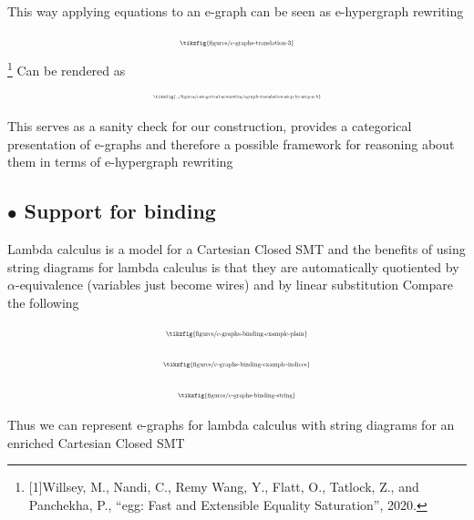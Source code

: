 \documentclass[aspectratio=169]{beamer}
\newcommand{\bsubsection}[1]{\subsection{$\bullet$ #1}}
\begin{document}
\begin{frame}{}
    \small
    This way applying equations to an e-graph can be seen as e-hypergraph rewriting

    \[
    \scalebox{0.5}{
    \tikzfig{figures/e-graphs-translation-3}
    }
    \]\footnote{[1]Willsey, M., Nandi, C., Remy Wang, Y., Flatt, O., Tatlock, Z., and Panchekha, P., “egg: Fast and Extensible Equality Saturation”, 2020.}
    Can be rendered as
    \[
        \scalebox{0.38}{
        \tikzfig{../figures/categorical-semantics/egraph-translation-step-by-step-a-b}
        }
    \]
\end{frame}

\begin{frame}
    \vfill
    This serves as a sanity check for our construction, provides a categorical presentation of e-graphs and therefore a possible framework for reasoning about them in terms of e-hypergraph rewriting
    \vfill
\end{frame}

\bsubsection{Support for binding}

\begin{frame}{}
    \small
    \vfill
    Lambda calculus is a model for a Cartesian Closed SMT and the benefits of using string diagrams for lambda calculus is that they are automatically quotiented by $\alpha$-equivalence (variables just become wires) and by linear substitution
    \vfill
    Compare the following

    \begin{minipage}{0.3\linewidth}
        \[
        \scalebox{0.5}{
        \tikzfig{figures/e-graphs-binding-example-plain}
        }
        \]
    \end{minipage}
    \hfill
    \begin{minipage}{0.3\linewidth}
        \[
        \scalebox{0.5}{
        \tikzfig{figures/e-graphs-binding-example-indices}
        }
        \]
    \end{minipage}
    \hfill
    \begin{minipage}{0.3\linewidth}
        \[
        \scalebox{0.5}{
        \tikzfig{figures/e-graphs-binding-string}
        }
        \]
    \end{minipage}
    \vfill
    
\end{frame}

\begin{frame}
    \vfill
    Thus we can represent e-graphs for lambda calculus with string diagrams for an enriched Cartesian Closed SMT
    \vfill
\end{frame}
\end{document}
